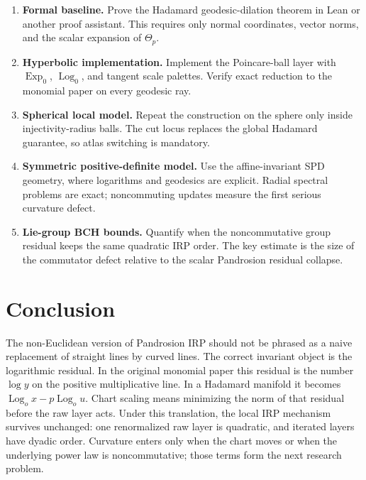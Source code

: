 \documentclass[10pt,a4paper]{article}
\theoremstyle{plain}
\theoremstyle{definition}
\theoremstyle{remark}
\newcommand{\Exp}{\operatorname{Exp}}
\newcommand{\Log}{\operatorname{Log}}
\begin{document}
\begin{enumerate}
  \item \textbf{Formal baseline.}  Prove the Hadamard geodesic-dilation theorem
  in Lean or another proof assistant.  This requires only normal coordinates,
  vector norms, and the scalar expansion of $\Theta_p$.
  \item \textbf{Hyperbolic implementation.}  Implement the Poincare-ball layer
  with $\Exp_0$, $\Log_0$, and tangent scale palettes.  Verify exact reduction
  to the monomial paper on every geodesic ray.
  \item \textbf{Spherical local model.}  Repeat the construction on the sphere
  only inside injectivity-radius balls.  The cut locus replaces the global
  Hadamard guarantee, so atlas switching is mandatory.
  \item \textbf{Symmetric positive-definite model.}  Use the affine-invariant
  SPD geometry, where logarithms and geodesics are explicit.  Radial spectral
  problems are exact; noncommuting updates measure the first serious curvature
  defect.
  \item \textbf{Lie-group BCH bounds.}  Quantify when the noncommutative group
  residual keeps the same quadratic IRP order.  The key estimate is the size of
  the commutator defect relative to the scalar Pandrosion residual collapse.
\end{enumerate}

\section{Conclusion}

The non-Euclidean version of Pandrosion IRP should not be phrased as a naive
replacement of straight lines by curved lines.  The correct invariant object is
the logarithmic residual.  In the original monomial paper this residual is the
number $\log y$ on the positive multiplicative line.  In a Hadamard manifold it
becomes $\Log_o x-p\Log_o u$.  Chart scaling means minimizing the norm of that
residual before the raw layer acts.  Under this translation, the local IRP
mechanism survives unchanged: one renormalized raw layer is quadratic, and
iterated layers have dyadic order.  Curvature enters only when the chart moves
or when the underlying power law is noncommutative; those terms form the next
research problem.
\end{document}
